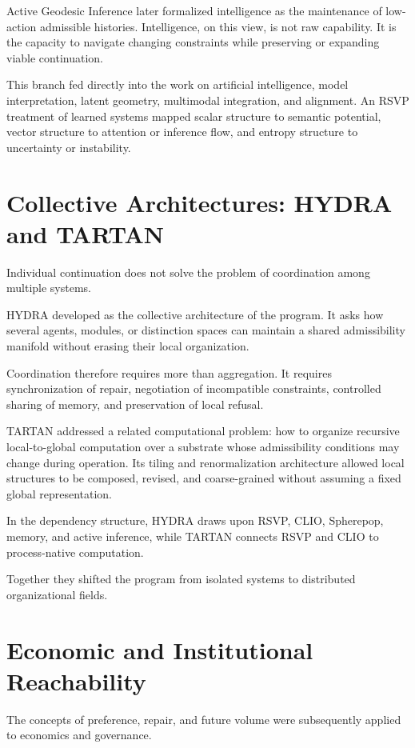 \documentclass[11pt,oneside]{book}
\numberwithin{equation}{chapter}
\theoremstyle{definition}
\theoremstyle{plain}
\begin{document}
Active Geodesic Inference later formalized intelligence as the maintenance
of low-action admissible histories. Intelligence, on this view, is not raw
capability. It is the capacity to navigate changing constraints while
preserving or expanding viable continuation.

This branch fed directly into the work on artificial intelligence, model
interpretation, latent geometry, multimodal integration, and alignment. An
RSVP treatment of learned systems mapped scalar structure to semantic
potential, vector structure to attention or inference flow, and entropy
structure to uncertainty or instability.

\section{Collective Architectures: HYDRA and TARTAN}

Individual continuation does not solve the problem of coordination among
multiple systems.

HYDRA developed as the collective architecture of the program. It asks how
several agents, modules, or distinction spaces can maintain a shared
admissibility manifold without erasing their local organization.

Coordination therefore requires more than aggregation. It requires
synchronization of repair, negotiation of incompatible constraints,
controlled sharing of memory, and preservation of local refusal.

TARTAN addressed a related computational problem: how to organize recursive
local-to-global computation over a substrate whose admissibility conditions
may change during operation. Its tiling and renormalization architecture
allowed local structures to be composed, revised, and coarse-grained
without assuming a fixed global representation.

In the dependency structure, HYDRA draws upon RSVP, CLIO, Spherepop, memory,
and active inference, while TARTAN connects RSVP and CLIO to process-native
computation.

Together they shifted the program from isolated systems to distributed
organizational fields.

\section{Economic and Institutional Reachability}

The concepts of preference, repair, and future volume were subsequently
applied to economics and governance.
\end{document}
